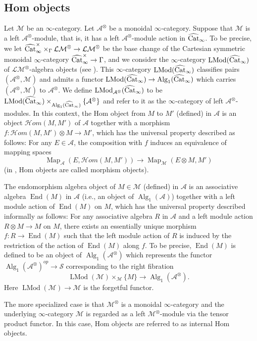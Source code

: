 \documentclass[leqno,12pt]{amsart}
\theoremstyle{plain}
\theoremstyle{definition}
\newcommand{\AAA}{\mathcal{A}}
\newcommand{\MMM}{\mathcal{M}}
\newcommand{\SSS}{\mathcal{S}}
\newcommand{\Map}{\operatorname{Map}}
\newcommand{\Alg}{\operatorname{Alg}}
\newcommand{\End}{\operatorname{End}}
\newcommand{\wCat}{\widehat{\textup{Cat}}_{\infty}}
\newcommand{\LMod}{\operatorname{LMod}}
\begin{document}
\subsection{Hom objects}
\label{homendobjectsec}
Let $\mathcal{M}$ be an $\infty$-category.
Let $\mathcal{A}^\otimes$ be a monoidal $\infty$-category.
Suppose that $\MMM$ is a left $\mathcal{A}^\otimes$-module, that is,
it has a left $\mathcal{A}^\otimes$-module action in $\wCat$.
To be precise, 
we let $\wCat^\times\times_{\Gamma}\mathcal{LM}^\otimes\to \mathcal{LM}^\otimes$
be the base change of the Cartesian symmetric monoidal $\infty$-category
$\wCat^\times\to \Gamma$, and we consider 
the $\infty$-category $\LMod(\wCat)$ of $\mathcal{LM}^\otimes$-algebra objects
(see \cite[4.2.1]{HA}).
This $\infty$-category $\LMod(\wCat)$ classifies pairs
$(\mathcal{A}^\otimes,\MMM)$ and admits a functor 
$\LMod(\wCat)\to \Alg_1(\wCat)$ which carries $(\mathcal{A}^\otimes,\MMM)$ to $\mathcal{A}^\otimes$.
We define $\LMod_{\AAA^\otimes}(\wCat)$ to be $\LMod(\wCat)\times_{\Alg_1(\wCat)}\{\AAA^\otimes\}$
and refer to it as the $\infty$-category of left $\mathcal{A}^\otimes$-modules.
In this context,
the Hom object from $M$ to $M'$ (defined) in $\mathcal{A}$ is an object $\mathcal{H}om(M,M')$ of $\mathcal{A}$
together with a morphism $f:\mathcal{H}om(M,M')\otimes M\to M'$, 
which has the universal property described as follows:
For any $E\in \mathcal{A}$, the composition with $f$ induces an equivalence of mapping spaces
\[
\Map_{\mathcal{A}}(E,\mathcal{H}om(M,M'))\to \Map_{\mathcal{M}}(E\otimes M, M')
\]
(in \cite{HA}, Hom objects are called morphism objects).

The endomorphism algebra object of $M\in \mathcal{M}$ (defined) in $\mathcal{A}$ is an associative
algebra $\End(M)$ in $\mathcal{A}$ (i.e., an object of $\Alg_1(\mathcal{A})$)
together with a left module action of $\End(M)$ on $M$, 
which has the universal property described informally as follows:
For any associative algebra $R$ in $\mathcal{A}$ and a left module action $R\otimes M\to M$
on $M$, there exists an essentially unique morphism $f:R\to \End(M)$
such that the left module action of $R$ is induced by the restriction of the action of $\End(M)$ along $f$.
To be precise, $\End(M)$ is defined to be an object of $\Alg_1(\mathcal{A}^\otimes)$ which represents
the functor $\Alg_1(\mathcal{A}^\otimes)^{op}\to \SSS$ corresponding to
the right fibration 
\[
\LMod(\MMM)\times_{\MMM}\{M\}\to \Alg_1(\mathcal{A}^\otimes).
\]
Here $\LMod(\MMM)\to \MMM$ is the forgetful functor.

The more specialized case is that $\MMM^\otimes$
is a monoidal $\infty$-category and the underlying $\infty$-category $\MMM$ is regarded as a left $\MMM^\otimes$-module via the tensor product functor.
In this case, Hom objects are referred to as internal Hom objects.
\end{document}
